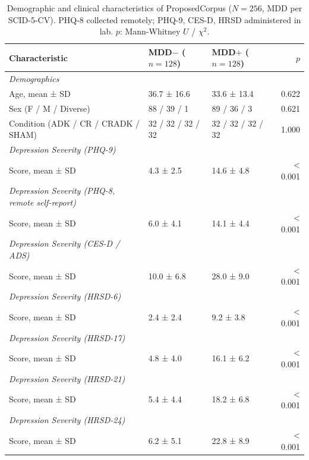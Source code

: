 \begin{table}[ht]
\centering
\footnotesize
\caption{Demographic and clinical characteristics of ProposedCorpus ($N=256$, MDD per SCID-5-CV). PHQ-8 collected remotely; PHQ-9, CES-D, HRSD administered in lab. $p$: Mann-Whitney $U$ / $\chi^2$.}
\label{tab:proposed_demographics_compact}
\begin{tabular}{lllr}
\toprule
\textbf{Characteristic} & \textbf{MDD$-$ ($n=128$)} & \textbf{MDD$+$ ($n=128$)} & $p$ \\
\midrule
\textit{Demographics} & & & \\
Age, mean ± SD & 36.7 ± 16.6 & 33.6 ± 13.4 & 0.622 \\
Sex (F / M / Diverse) & 88 / 39 / 1 & 89 / 36 / 3 & 0.621 \\
Condition (ADK / CR / CRADK / SHAM) & 32 / 32 / 32 / 32 & 32 / 32 / 32 / 32 & 1.000 \\
\textit{Depression Severity (PHQ-9)} & & & \\
Score, mean ± SD & 4.3 ± 2.5 & 14.6 ± 4.8 & < 0.001 \\
\textit{Depression Severity (PHQ-8, remote self-report)} & & & \\
Score, mean ± SD & 6.0 ± 4.1 & 14.1 ± 4.4 & < 0.001 \\
\textit{Depression Severity (CES-D / ADS)} & & & \\
Score, mean ± SD & 10.0 ± 6.8 & 28.0 ± 9.0 & < 0.001 \\
\textit{Depression Severity (HRSD-6)} & & & \\
Score, mean ± SD & 2.4 ± 2.4 & 9.2 ± 3.8 & < 0.001 \\
\textit{Depression Severity (HRSD-17)} & & & \\
Score, mean ± SD & 4.8 ± 4.0 & 16.1 ± 6.2 & < 0.001 \\
\textit{Depression Severity (HRSD-21)} & & & \\
Score, mean ± SD & 5.4 ± 4.4 & 18.2 ± 6.8 & < 0.001 \\
\textit{Depression Severity (HRSD-24)} & & & \\
Score, mean ± SD & 6.2 ± 5.1 & 22.8 ± 8.9 & < 0.001 \\
\bottomrule
\end{tabular}
\end{table}